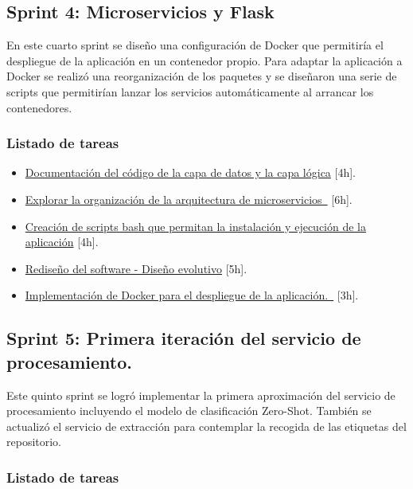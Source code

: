 \subsection{Sprint 4: Microservicios y Flask}

En este cuarto sprint se diseño una configuración de Docker que permitiría el despliegue de la aplicación en un contenedor propio. Para adaptar la aplicación a Docker se realizó una reorganización de los paquetes y se diseñaron una serie de scripts que permitirían lanzar los servicios automáticamente al arrancar los contenedores.

\subsubsection{Listado de tareas}

\begin{itemize} \setlength\itemsep{0.2em}
    \item \href{https://github.com/MrpYA45/github-text-mining-tfg/issues/10}{Documentación del código de la capa de datos y la capa lógica} [4h].
    \item \href{https://github.com/MrpYA45/github-text-mining-tfg/issues/2}{Explorar la organización de la arquitectura de microservicios } [6h].
    \item \href{https://github.com/MrpYA45/github-text-mining-tfg/issues/17}{Creación de scripts bash que permitan la instalación y ejecución de la aplicación} [4h].
    \item \href{https://github.com/MrpYA45/github-text-mining-tfg/issues/16}{Rediseño del software - Diseño evolutivo} [5h].
    \item \href{https://github.com/MrpYA45/github-text-mining-tfg/issues/15}{Implementación de Docker para el despliegue de la aplicación. } [3h].

\end{itemize}

\subsection{Sprint 5: Primera iteración del servicio de procesamiento.}

Este quinto sprint se logró implementar la primera aproximación del servicio de procesamiento incluyendo el modelo de clasificación Zero-Shot. También se actualizó el servicio de extracción para contemplar la recogida de las etiquetas del repositorio.

\subsubsection{Listado de tareas}

